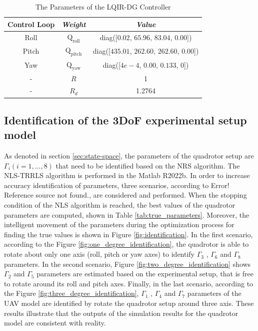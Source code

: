 \documentclass[3p,times]{elsarticle}
\begin{document}
\begin{table}[H]
	\renewcommand{\arraystretch}{1.3}
	\caption{The Parameters of the LQIR-DG Controller}
	\begin{center}
	\begin{tabular}{c c c}
	\hline
	\textbf{Control Loop} & \textbf{\textit{Weight}}& \textbf{\textit{Value}} \\
	\hline
	Roll & 
	$\boldsymbol{{\mathrm{Q_{\text{roll}}}}}$ & diag([$0.02$, $65.96$, $83.04$, $0.00$])\\
	Pitch & 
	$\boldsymbol{{\mathrm{Q_{\text{pitch}}}}}$ & diag([$435.01$, $262.60$, $262.60$, $0.00$])\\
	Yaw & 
	$\boldsymbol{{\mathrm{Q_{\text{yaw}}}}}$ & diag([$4e\!-\!4$, $0.00$, $0.133$, $0$])\\
	-& $R$ & 1\\
	-& $R_{d}$ & 1.2764\\
	\hline
	\end{tabular}
	\end{center}
	\label{tab:control weight_new}
\end{table}




\subsection{Identification of the 3DoF experimental setup model}

\noindent As denoted in section \ref{sec:state-space}, the parameters of the quadrotor setup are $\Gamma_i(i=1, ..., 8)$ that need to be
identified based on the NRS algorithm. The NLS-TRRLS algorithm is performed in the Matlab R2022b\textregistered. In order to increase accuracy identification of parameters, three scenarios, according to Error! Reference source not found., are considered and performed. When the stopping condition of the NLS algorithm is reached, the best values of the quadrotor parameters are computed, shown in Table \ref{tab:true_parameters}. Moreover, the intelligent movement of the parameters during the optimization process for finding the true values is shown in Figure \ref{fig:identification}.
In the first scenario, according to the Figure \ref{fig:one_degree_identification}, the quadrotor is able to rotate about only one axis (roll, pitch or yaw axes) to identify $\Gamma_3$ , $\Gamma_6$ and $\Gamma_8$ parameters. In the second scenario,
Figure \ref{fig:two_degree_identification} shows $\Gamma_2$ and $\Gamma_5$ parameters are estimated based on the experimental setup, that is free to rotate around its roll and pitch axes. Finally, in the last scenario, according to the Figure
\ref{fig:three_degree_identification}, $\Gamma_1$ , $\Gamma_4$ and $\Gamma_7$ parameters of the UAV model are identified by rotate the quadrotor setup
around three axis. These results illustrate that the outputs of the simulation results for the quadrotor model are consistent with reality.
\end{document}
